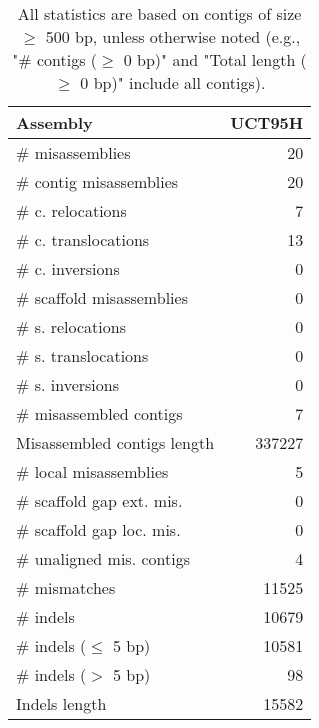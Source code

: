 \documentclass[12pt,a4paper]{article}
\begin{document}
\begin{table}[ht]
\begin{center}
\caption{All statistics are based on contigs of size $\geq$ 500 bp, unless otherwise noted (e.g., "\# contigs ($\geq$ 0 bp)" and "Total length ($\geq$ 0 bp)" include all contigs).}
\begin{tabular}{|l*{1}{|r}|}
\hline
Assembly & UCT95H \\ \hline
\# misassemblies & 20 \\ \hline
\hspace{2mm}\# contig misassemblies & 20 \\ \hline
\hspace{5mm}\# c. relocations & 7 \\ \hline
\hspace{5mm}\# c. translocations & 13 \\ \hline
\hspace{5mm}\# c. inversions & 0 \\ \hline
\hspace{2mm}\# scaffold misassemblies & 0 \\ \hline
\hspace{5mm}\# s. relocations & 0 \\ \hline
\hspace{5mm}\# s. translocations & 0 \\ \hline
\hspace{5mm}\# s. inversions & 0 \\ \hline
\# misassembled contigs & 7 \\ \hline
Misassembled contigs length & 337227 \\ \hline
\# local misassemblies & 5 \\ \hline
\# scaffold gap ext. mis. & 0 \\ \hline
\# scaffold gap loc. mis. & 0 \\ \hline
\# unaligned mis. contigs & 4 \\ \hline
\# mismatches & 11525 \\ \hline
\# indels & 10679 \\ \hline
\hspace{5mm}\# indels ($\leq$ 5 bp) & 10581 \\ \hline
\hspace{5mm}\# indels ($>$ 5 bp) & 98 \\ \hline
Indels length & 15582 \\ \hline
\end{tabular}
\end{center}
\end{table}
\end{document}

